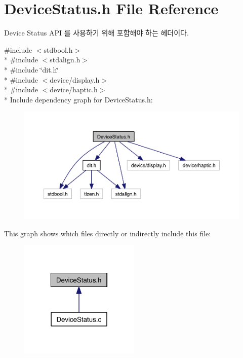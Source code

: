 \section{Device\-Status.\-h File Reference}
\label{DeviceStatus_8h}


Device Status A\-P\-I 를 사용하기 위해 포함해야 하는 헤더이다.  


{\ttfamily \#include $<$stdbool.\-h$>$}\\*
{\ttfamily \#include $<$stdalign.\-h$>$}\\*
{\ttfamily \#include \char`\"{}dit.\-h\char`\"{}}\\*
{\ttfamily \#include $<$device/display.\-h$>$}\\*
{\ttfamily \#include $<$device/haptic.\-h$>$}\\*
Include dependency graph for Device\-Status.\-h\-:\nopagebreak
\begin{figure}[H]
\begin{center}
\leavevmode
\includegraphics[width=350pt]{DeviceStatus_8h__incl}
\end{center}
\end{figure}
This graph shows which files directly or indirectly include this file\-:\nopagebreak
\begin{figure}[H]
\begin{center}
\leavevmode
\includegraphics[width=162pt]{DeviceStatus_8h__dep__incl}
\end{center}
\end{figure}

